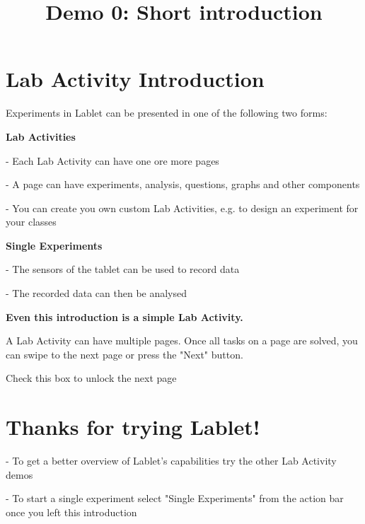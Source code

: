 \documentclass{article}
\begin{document}
\title{Demo 0: Short introduction}

\maketitle

\section{Lab Activity Introduction}

	Experiments in Lablet can be presented in one of the following two forms:


		\textbf{Lab Activities}

		- Each Lab Activity can have one ore more pages

		- A page can have experiments, analysis, questions, graphs and other components

		- You can create you own custom Lab Activities, e.g. to design an experiment for your classes

		\textbf{Single Experiments}

		- The sensors of the tablet can be used to record data

		- The recorded data can then be analysed

    \textbf{Even this introduction is a simple Lab Activity.}

    A Lab Activity can have multiple pages. Once all tasks on a page are solved, you can swipe to the next page or press the "Next" button.

	Check this box to unlock the next page

\section{Thanks for trying Lablet!}
	- To get a better overview of Lablet's capabilities try the other Lab Activity demos

	- To start a single experiment select "Single Experiments" from the action bar once you left this introduction
\end{document}
